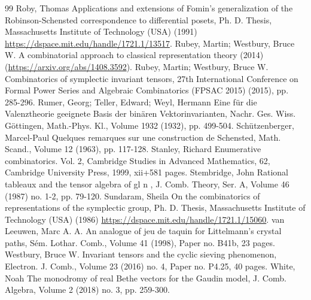 \documentclass[10pt]{article}
\theoremstyle{definition}
\begin{document}
\begin{thebibliography}{99}
 Roby, Thomas Applications and extensions of Fomin’s generalization of the Robinson-Schensted correspondence to differential posets, Ph. D. Thesis, Massachusetts Institute of Technology (USA) (1991) \url{https://dspace.mit.edu/handle/1721.1/13517}.
 Rubey, Martin; Westbury, Bruce W. A combinatorial approach to classical representation theory (2014) (\url{https://arxiv.org/abs/1408.3592}).
 Rubey, Martin; Westbury, Bruce W. Combinatorics of symplectic invariant tensors, 27th International Conference on Formal Power Series and Algebraic Combinatorics (FPSAC 2015) (2015), pp. 285-296.
 Rumer, Georg; Teller, Edward; Weyl, Hermann Eine für die Valenztheorie geeignete Basis der binären Vektorinvarianten, Nachr. Ges. Wiss. Göttingen, Math.-Phys. Kl., Volume 1932 (1932), pp. 499-504.
 Schützenberger, Marcel-Paul Quelques remarques sur une construction de Schensted, Math. Scand., Volume 12 (1963), pp. 117-128.
 Stanley, Richard Enumerative combinatorics. Vol. 2, Cambridge Studies in Advanced Mathematics, 62, Cambridge University Press, 1999, xii+581 pages.
 Stembridge, John Rational tableaux and the tensor algebra of gl n , J. Comb. Theory, Ser. A, Volume 46 (1987) no. 1-2, pp. 79-120.
 Sundaram, Sheila On the combinatorics of representations of the symplectic group, Ph. D. Thesis, Massachusetts Institute of Technology (USA) (1986) \url{https://dspace.mit.edu/handle/1721.1/15060}.
 van Leeuwen, Marc A. A. An analogue of jeu de taquin for Littelmann’s crystal paths, Sém. Lothar. Comb., Volume 41 (1998), Paper no. B41b, 23 pages.
 Westbury, Bruce W. Invariant tensors and the cyclic sieving phenomenon, Electron. J. Comb., Volume 23 (2016) no. 4, Paper no. P4.25, 40 pages.
 White, Noah The monodromy of real Bethe vectors for the Gaudin model, J. Comb. Algebra, Volume 2 (2018) no. 3, pp. 259-300.
\end{thebibliography}
\end{document}

